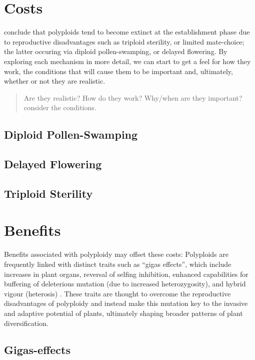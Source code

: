 \documentclass[openany, 12pt, draft]{book}
\begin{document}
\section{Costs}\label{costs}

\citet{Arrigo2012} conclude that polyploids tend to become extinct at
the establishment phase due to reproductive disadvantages such as
triploid sterility, or limited mate-choice; the latter occuring via
diploid pollen-swamping, or delayed flowering. By exploring each
mechanism in more detail, we can start to get a feel for how they work,
the conditions that will cause them to be important and, ultimately,
whether or not they are realistic.

\begin{quote}
Are they realistic? How do they work? Why/when are they important?
consider the conditions.
\end{quote}

\subsection{Diploid Pollen-Swamping}\label{pollen-swamping}

\subsection{Delayed Flowering}\label{flowering}

\subsection{Triploid Sterility}\label{sterility}

\section{Benefits}\label{benefits}

Benefits associated with polyploidy may offset these costs: Polyploids
are frequently linked with distinct traits such as ``gigas effects'',
which include increases in plant organs, reversal of selfing inhibition,
enhanced capabilities for buffering of deleterious mutation (due to
increased heterozygosity), and hybrid vigour (heterosis)
\citep{Woodhouse2009, Ramsey2014}. These traits are thought to overcome
the reproductive disadvantages of polyploidy and instead make this
mutation key to the invasive and adaptive potential of plants,
ultimately shaping broader patterns of plant diversification.

\subsection{Gigas-effects}\label{gigas}
\end{document}
